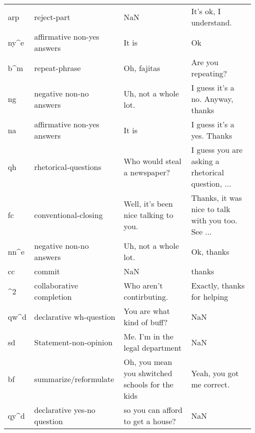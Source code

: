 \begin{tabular}{llll}
arp         &                   reject-part &                                              NaN &                             It's ok, I understand. \\
ny\textasciicircum e        &   affirmative non-yes answers &                                            It is &                                                 Ok \\
b\textasciicircum m         &                 repeat-phrase &                                      Oh, fajitas &                                 Are you repeating? \\
ng          &       negative non-no answers &                             Uh, not a whole lot. &                  I guess it's a no. Anyway, thanks \\
na          &   affirmative non-yes answers &                                            It is &                         I guess it's a yes. Thanks \\
qh          &          rhetorical-questions &                     Who would steal a newspaper? &  I guess you are asking a rhetorical question, ... \\
fc          &          conventional-closing &             Well, it’s been nice talking to you. &  Thanks, it was nice to talk with you too. See ... \\
nn\textasciicircum e        &       negative non-no answers &                             Uh, not a whole lot. &                                         Ok, thanks \\
cc          &                        commit &                                              NaN &                                             thanks \\
\textasciicircum 2          &      collaborative completion &                         Who aren't contirbuting. &                        Exactly, thanks for helping \\
qw\textasciicircum d        &       declarative wh-question &                       You are what kind of buff? &                                                NaN \\
sd          &         Statement-non-opinion &                  Me. I'm in the legal department &                                                NaN \\
bf          &         summarize/reformulate &  Oh, you mean you shwitched schools for the kids &                          Yeah, you got me correct. \\
qy\textasciicircum d        &   declarative yes-no question &                so you can afford to get a house? &                                                NaN \\

\end{tabular}
